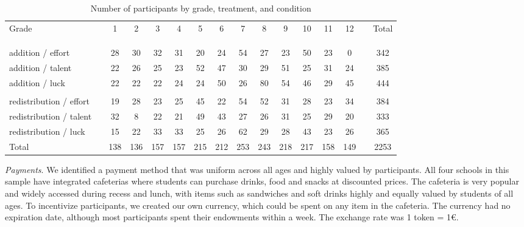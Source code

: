 \documentclass[11pt]{article}
\begin{document}
\begin{table}[htpb]
\small
\setlength{\tabcolsep}{.62\tabcolsep}
\begin{tabular}{lccccccccccccccc}  
Grade  			& & 1 & 2 & 3 & 4 & 5 & 6 & 7 & 8 & 9 & 10 & 11 & 12 & & Total \\ [-2.4ex] \\  \midrule \\ [-5.0ex] \\
addition / effort 			& & 28  & 30  & 32 & 31  & 20  & 24  & 54  & 27  & 23 & 50 & 23 & 0 & & 342 \\ 
addition / talent 	& & 22 & 26  & 25  & 23  & 52  & 47  & 30  & 29  & 51 & 25 & 31 & 24 & & 385  \\ 
addition / luck 		& & 22  & 22  & 22 & 24  & 24  & 50   & 26  & 80  & 54 & 46& 29 & 45 & & 444\\   [-2.1ex] \\
redistribution / effort 	& & 19  & 28  & 23 & 25  & 45  & 22  & 54  & 52  & 31 & 28 & 23 & 34 & & 384 \\  
redistribution / talent 	& & 32  & 8  & 22 & 21  & 49  & 43  & 27  & 26  & 31 & 25 & 29 & 20 & & 333 \\  
redistribution / luck 	& & 15  & 22  & 33  & 33  & 25  & 26  & 62  & 29  & 28 & 43 &23 & 26 & & 365  \\    \midrule
Total & & 138 & 136 & 157 & 157 & 215 & 212 & 253 & 243 & 218 & 217 & 158 & 149 & & 2253 \\  
\end{tabular} 
\centering\caption{Number of participants by grade, treatment, and condition} \label{table-population2}
\end{table}

\emph{Payments}.
We identified a payment method that was uniform across all ages and highly valued by participants. All four schools in this sample have integrated cafeterias where students can purchase drinks, food and snacks at discounted prices. The cafeteria is very popular and widely accessed during recess and lunch, with items such as sandwiches and soft drinks highly and equally valued by students of all ages. To incentivize participants, we created our own currency, which could be spent on any item in the cafeteria. The currency had no expiration date, although most participants spent their endowments within a week. The exchange rate was 1 token = 1\euro. \par \medskip
\end{document}

